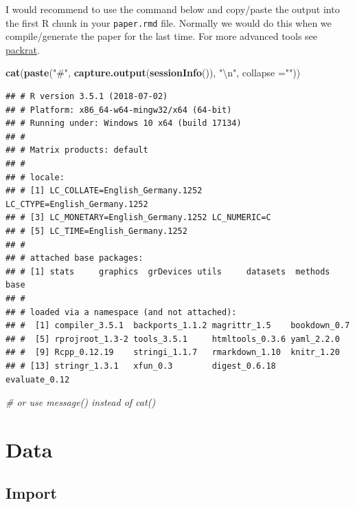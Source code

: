 \documentclass[12pt,]{article}
\newenvironment{Shaded}{\begin{snugshade}}{\end{snugshade}}
\newcommand{\KeywordTok}[1]{\textcolor[rgb]{0.13,0.29,0.53}{\textbf{#1}}}
\newcommand{\DataTypeTok}[1]{\textcolor[rgb]{0.13,0.29,0.53}{#1}}
\newcommand{\CharTok}[1]{\textcolor[rgb]{0.31,0.60,0.02}{#1}}
\newcommand{\StringTok}[1]{\textcolor[rgb]{0.31,0.60,0.02}{#1}}
\newcommand{\CommentTok}[1]{\textcolor[rgb]{0.56,0.35,0.01}{\textit{#1}}}
\newcommand{\NormalTok}[1]{#1}
\theoremstyle{definition}
\theoremstyle{definition}
\theoremstyle{definition}
\theoremstyle{remark}
\begin{document}
I would recommend to use the command below and copy/paste the output
into the first R chunk in your \texttt{paper.rmd} file. Normally we
would do this when we compile/generate the paper for the last time. For
more advanced tools see
\href{https://rstudio.github.io/packrat/}{packrat}.

\begin{Shaded}
\begin{Highlighting}[]
\KeywordTok{cat}\NormalTok{(}\KeywordTok{paste}\NormalTok{(}\StringTok{"#"}\NormalTok{, }\KeywordTok{capture.output}\NormalTok{(}\KeywordTok{sessionInfo}\NormalTok{()), }\StringTok{"}\CharTok{\textbackslash{}n}\StringTok{"}\NormalTok{, }\DataTypeTok{collapse =}\StringTok{""}\NormalTok{)) }
\end{Highlighting}
\end{Shaded}

\begin{verbatim}
## # R version 3.5.1 (2018-07-02) 
## # Platform: x86_64-w64-mingw32/x64 (64-bit) 
## # Running under: Windows 10 x64 (build 17134) 
## #  
## # Matrix products: default 
## #  
## # locale: 
## # [1] LC_COLLATE=English_Germany.1252  LC_CTYPE=English_Germany.1252    
## # [3] LC_MONETARY=English_Germany.1252 LC_NUMERIC=C                     
## # [5] LC_TIME=English_Germany.1252     
## #  
## # attached base packages: 
## # [1] stats     graphics  grDevices utils     datasets  methods   base      
## #  
## # loaded via a namespace (and not attached): 
## #  [1] compiler_3.5.1  backports_1.1.2 magrittr_1.5    bookdown_0.7    
## #  [5] rprojroot_1.3-2 tools_3.5.1     htmltools_0.3.6 yaml_2.2.0      
## #  [9] Rcpp_0.12.19    stringi_1.1.7   rmarkdown_1.10  knitr_1.20      
## # [13] stringr_1.3.1   xfun_0.3        digest_0.6.18   evaluate_0.12
\end{verbatim}

\begin{Shaded}
\begin{Highlighting}[]
  \CommentTok{# or use message() instead of cat()}
\end{Highlighting}
\end{Shaded}

\section{Data}\label{data}

\subsection{Import}\label{import}
\end{document}
